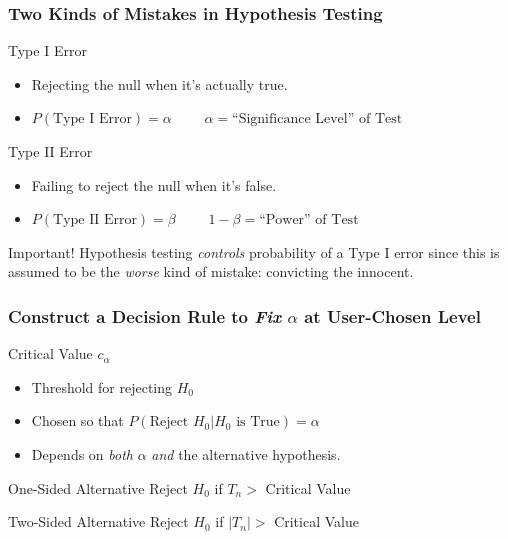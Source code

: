 \begin{frame}
	\frametitle{Two Kinds of Mistakes in Hypothesis Testing}
	\begin{block}
		{Type I Error}
		\begin{itemize}
			\item Rejecting the null when it's actually true.
			\item $P(\mbox{Type I Error}) = \alpha\quad \quad$ 
			\alert{$\boxed{\alpha= \mbox{``Significance Level'' of Test}}$}
		\end{itemize}
	\end{block}
	 \begin{block}
		{Type II Error}
		\begin{itemize}
			\item Failing to reject the null when it's false.
			\item $P(\mbox{Type II Error}) = \beta \quad \quad$ 
			\alert{$\boxed{1 - \beta= \mbox{``Power'' of Test}}$}
		\end{itemize}
	\end{block}
	\begin{alertblock}
		{Important!}
		Hypothesis testing \emph{controls} probability of a Type I error since this is assumed to be the \emph{worse} kind of mistake: convicting the innocent.	
	\end{alertblock}
\end{frame}
\begin{frame}
	\frametitle{Construct a Decision Rule to \emph{Fix} $\alpha$ at User-Chosen Level}

	\begin{block}
		{Critical Value $c_{\alpha}$} 
	\begin{itemize}
		\item Threshold for rejecting $H_0$
		\item Chosen so that $P(\mbox{Reject } H_0|H_0 \mbox{ is True}) = \alpha$
		\item Depends on \emph{both} $\alpha$ \emph{and} the alternative hypothesis.
	\end{itemize}
	\end{block}
	\begin{block}
		{One-Sided Alternative}
		Reject $H_0$ if $T_n >$ Critical Value
	\end{block}
	\begin{block}
		{Two-Sided Alternative}
		Reject $H_0$ if $|T_n| >$ Critical Value
	\end{block}
\end{frame}

